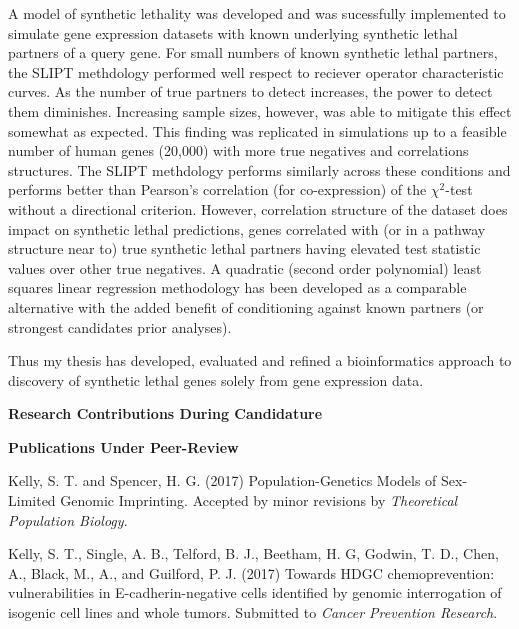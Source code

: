 A model of synthetic lethality was developed and was sucessfully implemented to simulate gene expression datasets with known underlying synthetic lethal partners of a query gene. For small numbers of known synthetic lethal partners, the SLIPT methdology performed well respect to reciever operator characteristic curves. As the number of true partners to detect increases, the power to detect them diminishes. Increasing sample sizes, however, was able to mitigate this effect somewhat as expected. This finding was replicated in simulations up to a feasible number of human genes (20,000) with more true negatives and correlations structures. The SLIPT methdology performs similarly across these conditions and performs better than Pearson's correlation (for co-expression) of the $\chi^2$-test without a directional criterion.  However, correlation structure of the dataset does impact on synthetic lethal predictions, genes correlated with (or in a pathway structure near to) true synthetic lethal partners having elevated test statistic values over other true negatives. A quadratic (second order polynomial) least squares linear regression methodology has been developed as a comparable alternative with the added benefit of conditioning against known partners (or strongest candidates prior analyses).


Thus my thesis has developed, evaluated and refined a bioinformatics approach to discovery of synthetic lethal genes solely from gene expression data.  

\iffalse

\clearpage

\begin{center}
 \textbf{Research Contributions During Candidature}
\end{center}

\textbf{Publications Under Peer-Review}


Kelly, S. T. and Spencer, H. G. (2017) Population-Genetics Models of Sex-Limited Genomic Imprinting. Accepted by minor revisions by \textit{Theoretical Population Biology}.

Kelly, S. T., Single, A. B., Telford, B. J., Beetham, H. G, Godwin, T. D., Chen, A., Black, M., A., and Guilford, P. J. (2017) Towards HDGC chemoprevention: vulnerabilities in E-cadherin-negative cells identified by genomic interrogation of isogenic cell lines and whole tumors.  Submitted to \textit{Cancer Prevention Research}.

